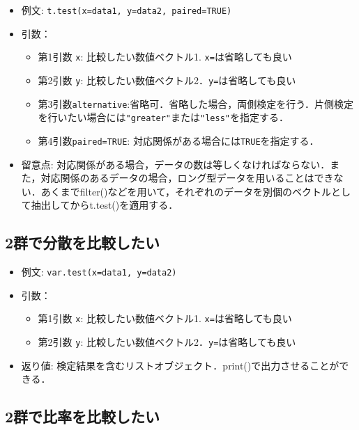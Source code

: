\documentclass[
  xelatex, ja=standard]{bxjsarticle}
\providecommand{\tightlist}{%
  \setlength{\itemsep}{0pt}\setlength{\parskip}{0pt}}
\begin{document}
\begin{itemize}
\tightlist
\item
  例文: \texttt{t.test(x=data1,\ y=data2,\ paired=TRUE)}
\item
  引数：

  \begin{itemize}
  \tightlist
  \item
    第1引数 \texttt{x}: 比較したい数値ベクトル1.
    \texttt{x=}は省略しても良い
  \item
    第2引数 \texttt{y}:
    比較したい数値ベクトル2．\texttt{y=}は省略しても良い
  \item
    第3引数\texttt{alternative}:省略可．省略した場合，両側検定を行う．片側検定を行いたい場合には\texttt{"greater"}または\texttt{"less"}を指定する．
  \item
    第4引数\texttt{paired=TRUE}:
    対応関係がある場合には\texttt{TRUE}を指定する．
  \end{itemize}
\item
  留意点:
  対応関係がある場合，データの数は等しくなければならない．また，対応関係のあるデータの場合，ロング型データを用いることはできない．あくまでfilter()などを用いて，それぞれのデータを別個のベクトルとして抽出してからt.test()を適用する．
\end{itemize}

\subsection{2群で分散を比較したい}\label{ux7fa4ux3067ux5206ux6563ux3092ux6bd4ux8f03ux3057ux305fux3044}

\begin{itemize}
\tightlist
\item
  例文: \texttt{var.test(x=data1,\ y=data2)}
\item
  引数：

  \begin{itemize}
  \tightlist
  \item
    第1引数 \texttt{x}: 比較したい数値ベクトル1.
    \texttt{x=}は省略しても良い
  \item
    第2引数 \texttt{y}:
    比較したい数値ベクトル2．\texttt{y=}は省略しても良い
  \end{itemize}
\item
  返り値:
  検定結果を含むリストオブジェクト．print()で出力させることができる．
\end{itemize}

\subsection{2群で比率を比較したい}\label{ux7fa4ux3067ux6bd4ux7387ux3092ux6bd4ux8f03ux3057ux305fux3044}
\end{document}
